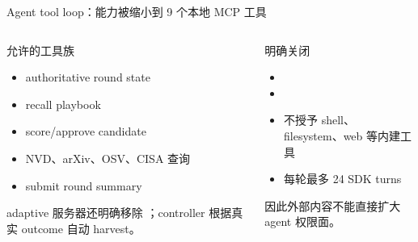 \begin{frame}{Agent tool loop：能力被缩小到 9 个本地 MCP 工具}
\begin{columns}[T,onlytextwidth]
\begin{exampleblock}{允许的工具族}
\begin{itemize}
  \item authoritative round state
  \item recall playbook
  \item score/approve candidate
  \item NVD、arXiv、OSV、CISA 查询
  \item submit round summary
\end{itemize}
adaptive 服务器还明确移除 ；controller 根据真实 outcome 自动 harvest。
\end{exampleblock}
\begin{alertblock}{明确关闭}
\begin{itemize}
  \item {}
  \item {}
  \item 不授予 shell、filesystem、web 等内建工具
  \item 每轮最多 24 SDK turns
\end{itemize}
因此外部内容不能直接扩大 agent 权限面。
\end{alertblock}
\end{columns}
\end{frame}

